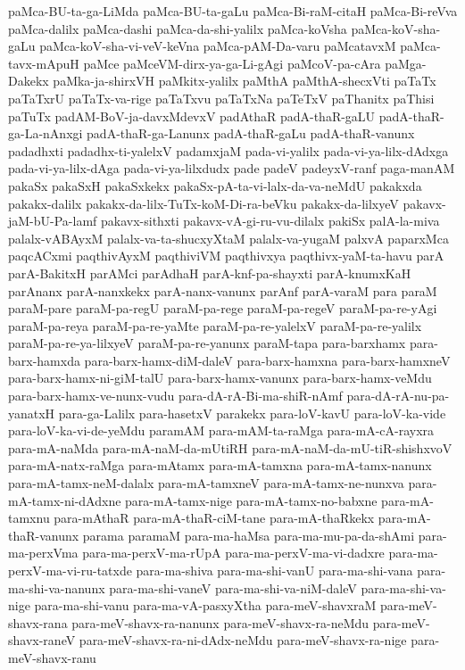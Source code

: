 {paMca-BU-ta-ga-LiMda
paMca-BU-ta-gaLu
paMca-Bi-raM-citaH
paMca-Bi-reVva
paMca-dalilx
paMca-dashi
paMca-da-shi-yalilx
paMca-koVsha
paMca-koV-sha-gaLu
paMca-koV-sha-vi-veV-keVna
paMca-pAM-Da-varu
paMcatavxM
paMca-tavx-mApuH
paMce
paMceVM-dirx-ya-ga-Li-gAgi
paMcoV-pa-cAra
paMga-Dakekx
paMka-ja-shirxVH‌
paMkitx-yalilx
paMthA
paMthA-shecxVti
paTaTx
paTaTxrU
paTaTx-va-rige
paTaTxvu
paTaTx‌Na
paTeTxV
paThanitx
paThisi
paTuTx
padAM-BoV-ja-davxMdevxV
padAthaR
padA-thaR-gaLU
padA-thaR-ga-La-nAnxgi
padA-thaR-ga-Lanunx
padA-thaR-gaLu
padA-thaR-vanunx
padadhxti
padadhx-ti-yalelxV
padamxjaM
pada-vi-yalilx
pada-vi-ya-lilx-dAdxga
pada-vi-ya-lilx-dAga
pada-vi-ya-lilxdudx
pade
padeV
padeyxV-ranf
paga-manAM
pakaSx
pakaSxH
pakaSxkekx
pakaSx-pA-ta-vi-lalx-da-va-neMdU
pakakxda
pakakx-dalilx
pakakx-da-lilx-TuTx-koM-Di-ra-beVku
pakakx-da-lilxyeV
pakavx-jaM-bU-Pa-lamf
pakavx-sithxti
pakavx-vA-gi-ru-vu-dilalx
pakiSx
palA-la-miva
palalx-vABAyxM
palalx-va-ta-shucxyXtaM
palalx-va-yugaM
palxvA
paparxMca
paqcACxmi
paqthivAyxM
paqthiviVM
paqthivxya
paqthivx-yaM-ta-havu
parA
parA-BakitxH
parAMci
parAdhaH
parA-knf-pa-shayxti
parA-knumxKaH
parAnanx
parA-nanxkekx
parA-nanx-vanunx
parAnf
parA-varaM
para
paraM
paraM-pare
paraM-pa-regU
paraM-pa-rege
paraM-pa-regeV
paraM-pa-re-yAgi
paraM-pa-reya
paraM-pa-re-yaMte
paraM-pa-re-yalelxV
paraM-pa-re-yalilx
paraM-pa-re-ya-lilxyeV
paraM-pa-re-yanunx
paraM-tapa
para-barxhamx
para-barx-hamxda
para-barx-hamx-diM-daleV
para-barx-hamxna
para-barx-hamxneV
para-barx-hamx-ni-giM-talU
para-barx-hamx-vanunx
para-barx-hamx-veMdu
para-barx-hamx-ve-nunx-vudu
para-dA-rA-Bi-ma-shiR-nAmf
para-dA-rA-nu-pa-yanatxH
para-ga-Lalilx
para-hasetxV
parakekx
para-loV-kavU
para-loV-ka-vide
para-loV-ka-vi-de-yeMdu
paramAM
para-mAM-ta-raMga
para-mA-cA-rayxra
para-mA-naMda
para-mA-naM-da-mUtiRH
para-mA-naM-da-mU-tiR-shishxvoV
para-mA-natx-raMga
para-mAtamx
para-mA-tamxna
para-mA-tamx-nanunx
para-mA-tamx-neM-dalalx
para-mA-tamxneV
para-mA-tamx-ne-nunxva
para-mA-tamx-ni-dAdxne
para-mA-tamx-nige
para-mA-tamx-no-babxne
para-mA-tamxnu
para-mAthaR
para-mA-thaR-ciM-tane
para-mA-thaRkekx
para-mA-thaR-vanunx
parama
paramaM
para-ma-haMsa
para-ma-mu-pa-da-shAmi
para-ma-perxVma
para-ma-perxV-ma-rUpA
para-ma-perxV-ma-vi-dadxre
para-ma-perxV-ma-vi-ru-tatxde
para-ma-shiva
para-ma-shi-vanU
para-ma-shi-vana
para-ma-shi-va-nanunx
para-ma-shi-vaneV
para-ma-shi-va-niM-daleV
para-ma-shi-va-nige
para-ma-shi-vanu
para-ma-vA-pasxyXtha
para-meV-shavxraM
para-meV-shavx-rana
para-meV-shavx-ra-nanunx
para-meV-shavx-ra-neMdu
para-meV-shavx-raneV
para-meV-shavx-ra-ni-dAdx-neMdu
para-meV-shavx-ra-nige
para-meV-shavx-ranu
}
